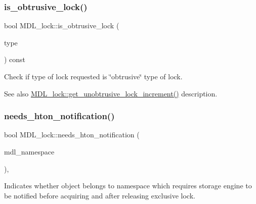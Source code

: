 \subsubsection{\texorpdfstring{is\+\_\+obtrusive\+\_\+lock()}{is\_obtrusive\_lock()}}
{\footnotesize\ttfamily bool M\+D\+L\+\_\+lock\+::is\+\_\+obtrusive\+\_\+lock (\begin{DoxyParamCaption}\item[{enum\+\_\+mdl\+\_\+type}]{type }\end{DoxyParamCaption}) const\hspace{0.3cm}{\ttfamily [inline]}}

Check if type of lock requested is \char`\"{}obtrusive\char`\"{} type of lock.

\begin{DoxySeeAlso}{See also}
\mbox{\hyperlink{classMDL__lock_aa8424d2f478663117e7ac5e435840342}{M\+D\+L\+\_\+lock\+::get\+\_\+unobtrusive\+\_\+lock\+\_\+increment()}} description. 
\end{DoxySeeAlso}
\mbox{\label{classMDL__lock_aa6cbff270ec3afad0feba7e97e9747bb}} 
\subsubsection{\texorpdfstring{needs\+\_\+hton\+\_\+notification()}{needs\_hton\_notification()}}
{\footnotesize\ttfamily bool M\+D\+L\+\_\+lock\+::needs\+\_\+hton\+\_\+notification (\begin{DoxyParamCaption}\item[{\mbox{\hyperlink{structMDL__key_a391ec4bd98fec6852a48f7856546ed3b}{M\+D\+L\+\_\+key\+::enum\+\_\+mdl\+\_\+namespace}}}]{mdl\+\_\+namespace }\end{DoxyParamCaption})\hspace{0.3cm}{\ttfamily [inline]}, {\ttfamily [static]}}

Indicates whether object belongs to namespace which requires storage engine to be notified before acquiring and after releasing exclusive lock. \mbox{\label{classMDL__lock_a580d9a0d9be93f90361cee67d0b4199f}} 
